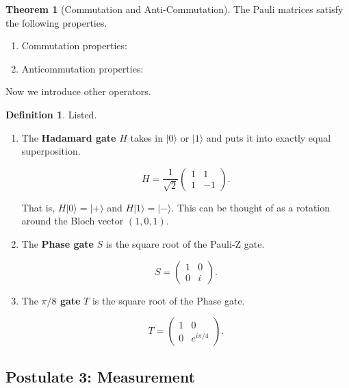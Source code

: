 \documentclass{article}
\theoremstyle{definition}
\newtheorem{theorem}{Theorem}[section]
\newtheorem{definition}{Definition}[section]
\begin{document}
      \begin{theorem}[Commutation and Anti-Commutation]
        The Pauli matrices satisfy the following properties. 
        \begin{enumerate}
          \item Commutation properties: 
           

          \item Anticommutation properties: 


        \end{enumerate}
      \end{theorem}

      Now we introduce other operators. 

      \begin{definition}
        Listed. 

        \begin{enumerate}
          \item The \textbf{Hadamard gate} $H$ takes in $|0\rangle$ or $|1\rangle$ and puts it into exactly equal superposition.

            \[H = \frac{1}{\sqrt{2}} \begin{pmatrix} 1 & 1 \\ 1 & -1 \end{pmatrix}.\]

          That is, $H|0\rangle = |+\rangle$ and $H|1\rangle = |-\rangle$. This can be thought of as a rotation around the Bloch vector $(1, 0, 1)$.

          \item The \textbf{Phase gate} $S$ is the square root of the Pauli-Z gate.

            \[S = \begin{pmatrix} 1 & 0 \\ 0 & i \end{pmatrix}.\]

          \item The \textbf{$\pi/8$ gate} $T$ is the square root of the Phase gate.

            \[T = \begin{pmatrix} 1 & 0 \\ 0 & e^{i \pi/4} \end{pmatrix}.\]
        \end{enumerate} 
      \end{definition}

      
  \subsection{Postulate 3: Measurement}
\end{document}
